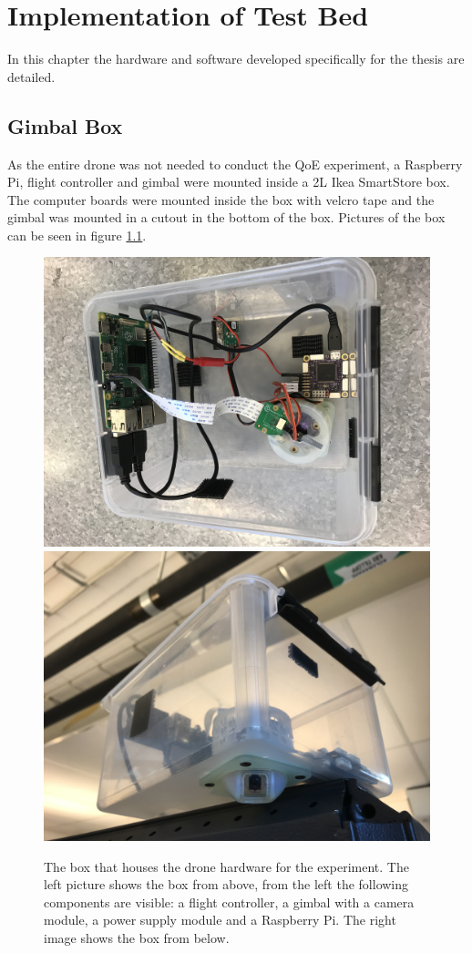 \documentclass[nofilelist]{cslthse-msc}
\begin{document}
\chapter{Implementation of Test Bed}
In this chapter the hardware and software developed specifically for the thesis are detailed.

\section{Gimbal Box}
As the entire drone was not needed to conduct the QoE experiment, a Raspberry Pi, flight controller and gimbal were mounted inside a 2L Ikea SmartStore box. The computer boards were mounted inside the box with velcro tape and the gimbal was mounted in a cutout in the bottom of the box. Pictures of the box can be seen in figure \ref{fig:drone-setup}.

\begin{figure}[htp]
   \centering
   \includegraphics[width=.47\textwidth]{images/drone-box-1.jpg}\hfill
   \includegraphics[width=.47\textwidth]{images/drone-box-2.jpg}
   \caption{The box that houses the drone hardware for the experiment. The left picture shows the box from above, from the left the following components are visible: a flight controller, a gimbal with a camera module, a power supply module and a Raspberry Pi. The right image shows the box from below.}
   \label{fig:drone-setup}
\end{figure}
\end{document}
